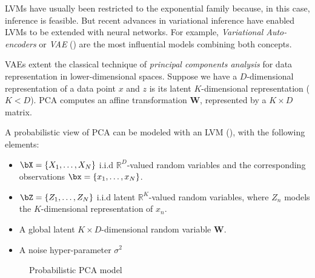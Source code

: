 LVMs have usually been restricted to the exponential family because, in this case, inference is feasible. But recent advances in variational inference have enabled LVMs to be extended with neural networks. For example, \emph{Variational Auto-encoders} or \emph{VAE} (\cite{kingma2013auto}) are the most influential models combining both concepts.

VAEs extent the classical technique of \emph{principal components analysis} for data representation in lower-dimensional spaces. Suppose we have a \(D\)-dimensional representation of a data point \(x\) and \(z\) is its latent \(K\)-dimensional representation (\(K < D\)). PCA computes an affine transformation \(\bm{W}\), represented by a \(K \times D\) matrix.


A probabilistic view of PCA can be modeled with an LVM (\cite{tipping1999probabilistic}), with the following elements:

\begin{itemize}
  \item \(\bX = \{X_{1},\dots,X_{N}\}\) i.i.d \(\mathbb{R}^{D}\)-valued random variables and the corresponding observations \(\bx = \{x_{1},\dots, x_{N}\}\).
  \item \(\bZ = \{Z_{1}, \dots, Z_{N}\}\) i.i.d latent \(\mathbb{R}^{K}\)-valued random variables, where \(Z_{n}\) models the \(K\)-dimensional representation of \(x_{n}\).
  \item A global latent \(K\times D\)-dimensional random variable \(\bm{W}\).
  \item A noise hyper-parameter \(\sigma^{2}\)
\end{itemize}

\begin{figure}[h!]
  \centering
  \caption{Probabilistic PCA model}\label{fig:ppca}
\end{figure}



